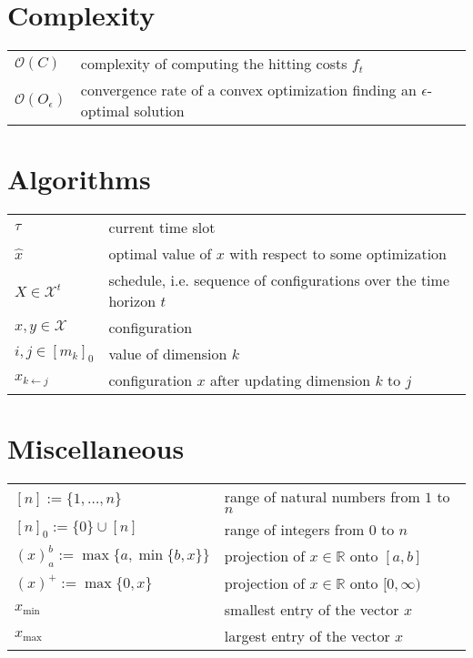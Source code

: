 \section*{Complexity}

\begin{tabularx}{\textwidth}{lX}
    $\mathcal{O}(C)$ & complexity of computing the hitting costs $f_t$ \\
    $\mathcal{O}(O_{\epsilon})$ & convergence rate of a convex optimization finding an $\epsilon$-optimal solution \\
\end{tabularx}

\vspace{\fill}

\section*{Algorithms}

\begin{tabularx}{\textwidth}{lX}
    $\tau$ & current time slot \\
    $\hat{x}$ & optimal value of $x$ with respect to some optimization \\
    $X \in \mathcal{X}^t$ & schedule, i.e. sequence of configurations over the time horizon $t$ \\
    $x, y \in \mathcal{X}$ & configuration \\
    $i, j \in [m_k]_0$ & value of dimension $k$ \\
    $x_{k \gets j}$ & configuration $x$ after updating dimension $k$ to $j$ \\
\end{tabularx}

\section*{Miscellaneous}

\begin{tabularx}{\textwidth}{lX}
    $[n] := \{1, \dots, n\}$ & range of natural numbers from $1$ to $n$ \\
    $[n]_0 := \{0\} \cup [n]$ & range of integers from $0$ to $n$ \\
    $(x)_a^b := \max\{a, \min\{b, x\}\}$ & projection of $x \in \mathbb{R}$ onto $[a,b]$ \\
    $(x)^+ := \max\{0, x\}$ & projection of $x \in \mathbb{R}$ onto $[0, \infty)$ \\
    $x_{\text{min}}$ & smallest entry of the vector $x$ \\
    $x_{\text{max}}$ & largest entry of the vector $x$ \\
\end{tabularx}
